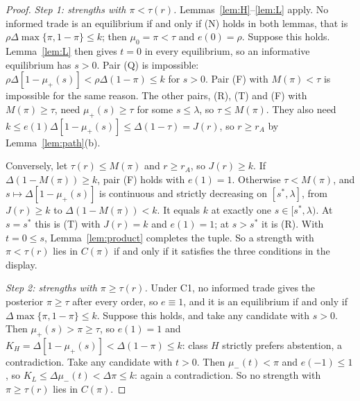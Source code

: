 \documentclass[11pt]{article}
\theoremstyle{definition}
\begin{document}
\begin{proof}
\emph{Step 1: strengths with $\pi<\tau(r)$.} Lemmas~\ref{lem:H}--\ref{lem:L} apply. No informed trade is an
equilibrium if and only if (N) holds in both lemmas, that is $\rho\Delta\max\{\pi,1-\pi\}\le k$; then
$\mu_0=\pi<\tau$ and $e(0)=\rho$. Suppose this holds. Lemma~\ref{lem:L} then gives $t=0$ in every equilibrium, so
an informative equilibrium has $s>0$. Pair (Q) is impossible: $\rho\Delta[1-\mu_+(s)]<\rho\Delta(1-\pi)\le k$ for
$s>0$. Pair (F) with $M(\pi)<\tau$ is impossible for the same reason. The other pairs, (R), (T) and (F) with
$M(\pi)\ge\tau$, need $\mu_+(s)\ge\tau$ for some $s\le\lambda$, so $\tau\le M(\pi)$. They also need
$k\le e(1)\Delta[1-\mu_+(s)]\le\Delta(1-\tau)=J(r)$, so $r\ge r_A$ by Lemma~\ref{lem:path}(b).

Conversely, let $\tau(r)\le M(\pi)$ and $r\ge r_A$, so $J(r)\ge k$. If $\Delta(1-M(\pi))\ge k$, pair (F) holds with
$e(1)=1$. Otherwise $\tau<M(\pi)$, and $s\mapsto\Delta[1-\mu_+(s)]$ is continuous and strictly decreasing on
$[s^*,\lambda]$, from $J(r)\ge k$ to $\Delta(1-M(\pi))<k$. It equals $k$ at exactly one $s\in[s^*,\lambda)$. At
$s=s^*$ this is (T) with $J(r)=k$ and $e(1)=1$; at $s>s^*$ it is (R). With $t=0\le s$, Lemma~\ref{lem:product}
completes the tuple. So a strength with $\pi<\tau(r)$ lies in $C(\pi)$ if and only if it satisfies the three
conditions in the display.

\emph{Step 2: strengths with $\pi\ge\tau(r)$.} Under C1, no informed trade gives the posterior $\pi\ge\tau$ after
every order, so $e\equiv1$, and it is an equilibrium if and only if $\Delta\max\{\pi,1-\pi\}\le k$. Suppose this
holds, and take any candidate with $s>0$. Then $\mu_+(s)>\pi\ge\tau$, so $e(1)=1$ and
$K_H=\Delta[1-\mu_+(s)]<\Delta(1-\pi)\le k$: class $H$ strictly prefers abstention, a contradiction. Take any
candidate with $t>0$. Then $\mu_-(t)<\pi$ and $e(-1)\le1$, so $K_L\le\Delta\mu_-(t)<\Delta\pi\le k$: again a
contradiction. So no strength with $\pi\ge\tau(r)$ lies in $C(\pi)$.


\end{proof}
\end{document}
